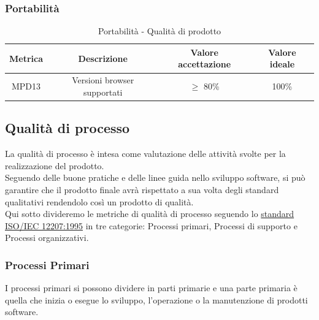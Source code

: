 \documentclass[10pt]{article}
\begin{document}
\begin{justify}
\subsubsection{Portabilità}
\begin{table}[H]
  \centering
\begin{tabular}{|c|c|c|c|}
  \hline
  \textbf{Metrica} & \textbf{Descrizione} & \textbf{Valore accettazione} & \textbf{Valore ideale}\\
  \hline
  MPD13 & Versioni browser supportati & $\geq$ 80\% & 100\% \\
  \hline
\end{tabular}
\caption{Portabilità - Qualità di prodotto}
\label{tab:portabilità}
\end{table}


\subsection{Qualità di processo}
La qualità di processo è intesa come valutazione delle attività svolte per la realizzazione del prodotto.\\
Seguendo delle buone pratiche e delle linee guida nello sviluppo software, si può garantire che il prodotto finale avrà rispettato a sua volta degli standard qualitativi rendendolo così un prodotto di qualità.\\
Qui sotto divideremo le metriche di qualità di processo seguendo lo \hyperref[ISO 12207:1995]{standard ISO/IEC 12207:1995} in tre categorie: Processi primari, Processi di supporto e Processi organizzativi.\\
\subsubsection{Processi Primari}
I processi primari si possono dividere in parti primarie e una parte primaria è quella che inizia o esegue lo sviluppo, l'operazione o la manutenzione di prodotti software.\\


\end{justify}
\end{document}
